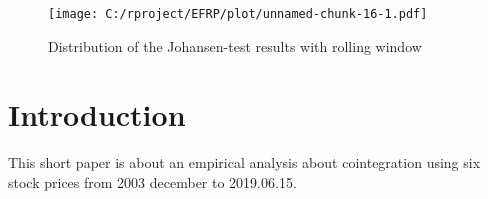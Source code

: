 \documentclass[12pt, a4paper, twoside, titlepage]{article}
\begin{document}
\begin{figure}[ht]
  \centering
  \texttt{[image: C:/rproject/EFRP/plot/unnamed-chunk-16-1.pdf]}
  \label{fig8}
  \caption{Distribution of the Johansen-test results with rolling window}
\end{figure}

\section*{Introduction}

This short paper is about an empirical analysis about cointegration using six stock prices from 2003 december to 2019.06.15.



\end{document}
